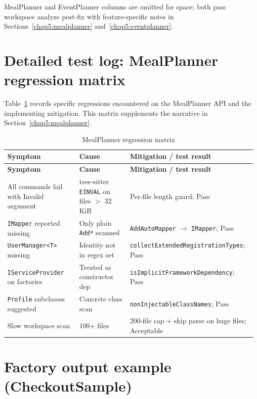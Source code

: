 MealPlanner and EventPlanner columns are omitted for space; both pass workspace analyze post-fix with feature-specific notes in Sections~\ref{chap5:mealplanner} and~\ref{chap5:eventplanner}.

\section{Detailed test log: MealPlanner regression matrix}
\label{chap5:mealplanner-matrix}

Table~\ref{tab:mealplanner-regressions} records specific regressions encountered on the MealPlanner API and the implementing mitigation. This matrix supplements the narrative in Section~\ref{chap5:mealplanner}.

\begin{longtable}{|p{3.2cm}|p{4.5cm}|p{5.8cm}|}
\caption{MealPlanner regression matrix} \label{tab:mealplanner-regressions} \\
\hline
\textbf{Symptom} & \textbf{Cause} & \textbf{Mitigation / test result} \\
\hline
\endfirsthead
\hline
\textbf{Symptom} & \textbf{Cause} & \textbf{Mitigation / test result} \\
\hline
\endhead
All commands fail with Invalid argument & tree-sitter \texttt{EINVAL} on files $>$ 32\,KiB & Per-file length guard; Pass \\
\hline
\texttt{IMapper} reported missing & Only plain \texttt{Add*} scanned & \texttt{AddAutoMapper} $\rightarrow$ \texttt{IMapper}; Pass \\
\hline
\texttt{UserManager<T>} missing & Identity not in regex set & \texttt{collectExtendedRegistrationTypes}; Pass \\
\hline
\texttt{IServiceProvider} on factories & Treated as constructor dep & \texttt{isImplicitFrameworkDependency}; Pass \\
\hline
\texttt{Profile} subclasses suggested & Concrete class scan & \texttt{nonInjectableClassNames}; Pass \\
\hline
Slow workspace scan & 100+ files & 200-file cap + skip parse on huge files; Acceptable \\
\hline
\end{longtable}

\section{Factory output example (CheckoutSample)}
\label{chap5:factory-example}

